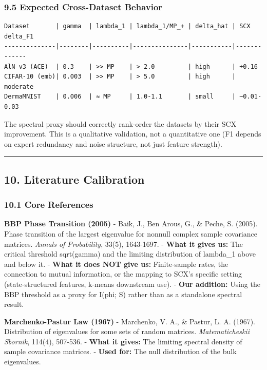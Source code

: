 \documentclass[
  12pt,
]{article}
\begin{document}
\subsubsection{9.5 Expected Cross-Dataset
Behavior}\label{expected-cross-dataset-behavior}

\begin{verbatim}
Dataset       | gamma  | lambda_1 | lambda_1/MP_+ | delta_hat | SCX delta_F1
--------------|--------|----------|---------------|-----------|-------------
AlN v3 (ACE)  | 0.3    | >> MP    | > 2.0         | high      | +0.16
CIFAR-10 (emb)| 0.003  | >> MP    | > 5.0         | high      | moderate
DermaMNIST    | 0.006  | ≈ MP     | 1.0-1.1       | small     | ~0.01-0.03
\end{verbatim}

The spectral proxy should correctly rank-order the datasets by their SCX
improvement. This is a qualitative validation, not a quantitative one
(F1 depends on expert redundancy and noise structure, not just feature
strength).

\begin{center}\rule{0.5\linewidth}{0.5pt}\end{center}

\subsection{10. Literature Calibration}\label{literature-calibration}

\subsubsection{10.1 Core References}\label{core-references}

\textbf{BBP Phase Transition (2005)} - Baik, J., Ben Arous, G., \&
Peche, S. (2005). Phase transition of the largest eigenvalue for nonnull
complex sample covariance matrices. \emph{Annals of Probability}, 33(5),
1643-1697. - \textbf{What it gives us:} The critical threshold
sqrt(gamma) and the limiting distribution of lambda\_1 above and below
it. - \textbf{What it does NOT give us:} Finite-sample rates, the
connection to mutual information, or the mapping to SCX's specific
setting (state-structured features, k-means downstream use). -
\textbf{Our addition:} Using the BBP threshold as a proxy for I(phi; S)
rather than as a standalone spectral result.

\textbf{Marchenko-Pastur Law (1967)} - Marchenko, V. A., \& Pastur, L.
A. (1967). Distribution of eigenvalues for some sets of random matrices.
\emph{Matematicheskii Sbornik}, 114(4), 507-536. - \textbf{What it
gives:} The limiting spectral density of sample covariance matrices. -
\textbf{Used for:} The null distribution of the bulk eigenvalues.
\end{document}
